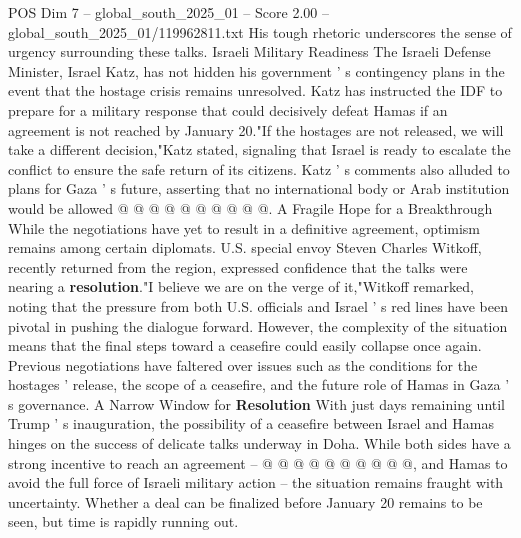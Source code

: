 \begin{textsample}{POS Dim 7 – global\_south\_2025\_01 – Score 2.00 – global\_south\_2025\_01/119962811.txt}
His tough rhetoric underscores the sense of urgency surrounding these talks.
Israeli Military Readiness The Israeli Defense Minister, Israel Katz, has not hidden his government ' s contingency plans in the event that the hostage crisis remains unresolved.
Katz has instructed the IDF to prepare for a military response that could decisively defeat Hamas if an agreement is not reached by January 20."If the hostages are not released, we will take a different decision,"Katz stated, signaling that Israel is ready to escalate the conflict to ensure the safe return of its citizens.
Katz ' s comments also alluded to plans for Gaza ' s future, asserting that no international body or Arab institution would be allowed @ @ @ @ @ @ @ @ @ @.
A Fragile Hope for a Breakthrough While the negotiations have yet to result in a definitive agreement, optimism remains among certain diplomats.
U.S. special envoy Steven Charles Witkoff, recently returned from the region, expressed confidence that the talks were nearing a \textbf{resolution}."I believe we are on the verge of it,"Witkoff remarked, noting that the pressure from both U.S. officials and Israel ' s red lines have been pivotal in pushing the dialogue forward.
However, the complexity of the situation means that the final steps toward a ceasefire could easily collapse once again.
Previous negotiations have faltered over issues such as the conditions for the hostages ' release, the scope of a ceasefire, and the future role of Hamas in Gaza ' s governance.
A Narrow Window for \textbf{Resolution} With just days remaining until Trump ' s inauguration, the possibility of a ceasefire between Israel and Hamas hinges on the success of delicate talks underway in Doha.
While both sides have a strong incentive to reach an agreement -- @ @ @ @ @ @ @ @ @ @, and Hamas to avoid the full force of Israeli military action -- the situation remains fraught with uncertainty.
Whether a deal can be finalized before January 20 remains to be seen, but time is rapidly running out.

\end{textsample}
